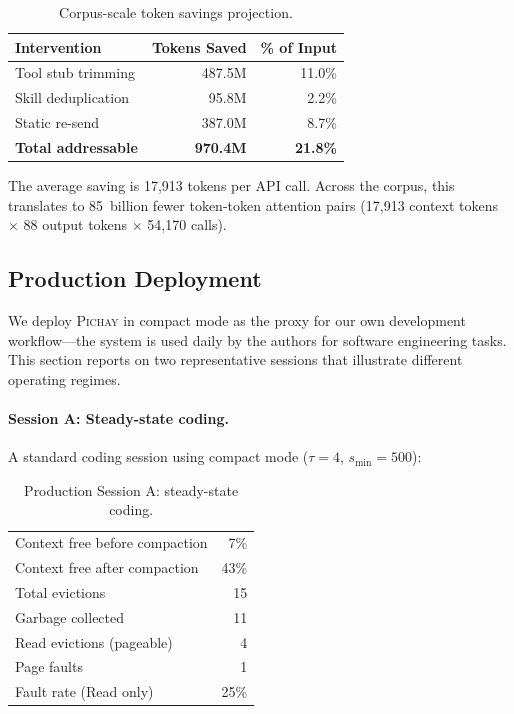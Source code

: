 \begin{table}[ht]
\centering
\caption{Corpus-scale token savings projection.}
\label{tab:corpus-tokens}
\small
\begin{tabular}{@{}lrr@{}}
\toprule
\textbf{Intervention} & \textbf{Tokens Saved} & \textbf{\% of Input} \\
\midrule
Tool stub trimming & 487.5M & 11.0\% \\
Skill deduplication & 95.8M & 2.2\% \\
Static re-send & 387.0M & 8.7\% \\
\midrule
\textbf{Total addressable} & \textbf{970.4M} & \textbf{21.8\%} \\
\bottomrule
\end{tabular}
\end{table}

The average saving is 17{,}913 tokens per API call. Across the
corpus, this translates to 85~billion fewer token-token attention
pairs (17{,}913 context tokens $\times$ 88 output tokens $\times$
54{,}170 calls).

\subsection{Production Deployment}
\label{sec:production}

We deploy \textsc{Pichay} in compact mode as the proxy for our own
development workflow---the system is used daily by the authors for
software engineering tasks. This section reports on two
representative sessions that illustrate different operating regimes.

\paragraph{Session A: Steady-state coding.}
A standard coding session using compact mode ($\tau = 4$,
$s_{\min} = 500$):

\begin{table}[ht]
\centering
\caption{Production Session A: steady-state coding.}
\label{tab:session-a}
\small
\begin{tabular}{@{}lr@{}}
\toprule
Context free before compaction & 7\% \\
Context free after compaction & 43\% \\
Total evictions & 15 \\
Garbage collected & 11 \\
Read evictions (pageable) & 4 \\
Page faults & 1 \\
Fault rate (Read only) & 25\% \\
\bottomrule
\end{tabular}
\end{table}

